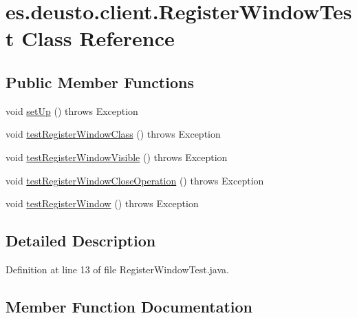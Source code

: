 \hypertarget{classes_1_1deusto_1_1client_1_1_register_window_test}{}\section{es.\+deusto.\+client.\+Register\+Window\+Test Class Reference}
\label{classes_1_1deusto_1_1client_1_1_register_window_test}
\subsection*{Public Member Functions}
\begin{DoxyCompactItemize}
\item 
void \hyperlink{classes_1_1deusto_1_1client_1_1_register_window_test_a33450653f61309ce014424203298d7e1}{set\+Up} ()  throws Exception 
\item 
void \hyperlink{classes_1_1deusto_1_1client_1_1_register_window_test_aa855baa24326982f71b130ba029ac65e}{test\+Register\+Window\+Class} ()  throws Exception 
\item 
void \hyperlink{classes_1_1deusto_1_1client_1_1_register_window_test_a7aa05237597943e612504c032609486e}{test\+Register\+Window\+Visible} ()  throws Exception 
\item 
void \hyperlink{classes_1_1deusto_1_1client_1_1_register_window_test_acd9f26a04a5bc49f4366864e55df939d}{test\+Register\+Window\+Close\+Operation} ()  throws Exception 
\item 
void \hyperlink{classes_1_1deusto_1_1client_1_1_register_window_test_a23ef407d5629d1ecf6a4bdabc8a9a7f7}{test\+Register\+Window} ()  throws Exception 
\end{DoxyCompactItemize}


\subsection{Detailed Description}


Definition at line 13 of file Register\+Window\+Test.\+java.



\subsection{Member Function Documentation}
\mbox{\label{classes_1_1deusto_1_1client_1_1_register_window_test_a33450653f61309ce014424203298d7e1}} 
